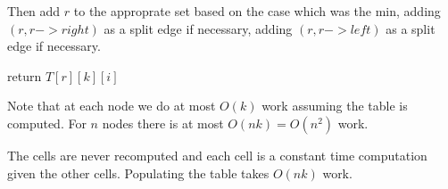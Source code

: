 \documentclass[11pt]{article}
\begin{document}
        Then add $r$ to the approprate set based on the case which was the min,
        adding $(r, r->right)$ as a split edge if necessary,
        adding $(r, r->left)$ as a split edge if necessary.

   return $T[r][k][i]$


Note that at each node we do at most $O(k)$ work assuming the table is computed.
For $n$ nodes there is at most $O(nk) = O(n^2)$ work.

The cells are never recomputed and each cell is a constant time computation given the other cells. Populating the table takes $O(nk)$ work.
\end{document}
